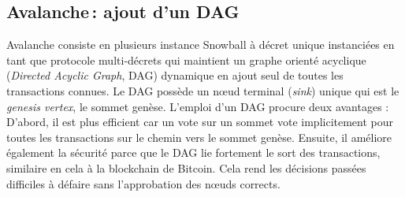 \subsection{Avalanche\,: ajout d'un DAG}%

Avalanche consiste en plusieurs instance Snowball à décret unique instanciées en tant que protocole multi-décrets qui maintient un graphe orienté acyclique (\emph{Directed Acyclic Graph},  DAG) dynamique en ajout seul de toutes les transactions connues.
Le DAG possède un nœud terminal (\emph{sink}) unique qui est le \emph{genesis vertex}, le sommet genèse. %
L'emploi d'un DAG procure deux avantages :
D'abord, il est plus efficient car un vote sur un sommet vote implicitement pour toutes les transactions sur le chemin vers le sommet genèse.
Ensuite, il améliore également la sécurité parce que le DAG lie fortement le sort des transactions, similaire en cela à la blockchain de Bitcoin.
Cela rend les décisions passées difficiles à défaire sans l'approbation des nœuds corrects.


